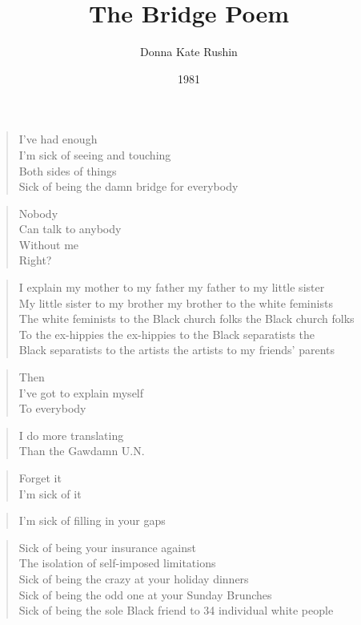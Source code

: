 \documentclass{article}
\title{The Bridge Poem}
\author{Donna Kate Rushin}
\date{1981}
\begin{document}
\maketitle

\begin{verse}
	I've had enough \\
	I'm sick of seeing and touching \\
	Both sides of things \\
	Sick of being the damn bridge for everybody
\end{verse}

\begin{verse}
	Nobody \\
	Can talk to anybody \\
	Without me \\
	Right?
\end{verse}

\begin{verse}
	I explain my mother to my father my father to my little sister \\
	My little sister to my brother my brother to the white feminists \\
	The white feminists to the Black church folks the Black church folks \\
	To the ex-hippies the ex-hippies to the Black separatists the \\
	Black separatists to the artists the artists to my friends' parents
\end{verse}

\begin{verse}
	Then \\
	I've got to explain myself \\
	To everybody
\end{verse}

\begin{verse}
	I do more translating \\
	Than the Gawdamn U.N.
\end{verse}

\begin{verse}
	Forget it \\
	I'm sick of it
\end{verse}

\begin{verse}
	I'm sick of filling in your gaps
\end{verse}

\begin{verse}
	Sick of being your insurance against \\
	The isolation of self-imposed limitations \\
	Sick of being the crazy at your holiday dinners \\
	Sick of being the odd one at your Sunday Brunches \\
	Sick of being the sole Black friend to 34 individual white people
\end{verse}
\end{document}
